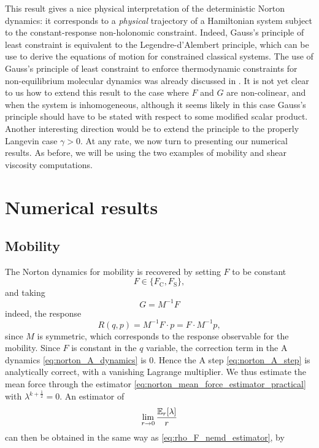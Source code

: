 This result gives a nice physical interpretation of the deterministic Norton dynamics: it corresponds to a \textit{physical} trajectory of a Hamiltonian system subject to the constant-response non-holonomic constraint.
Indeed, Gauss's principle of least constraint \cite{G29} is equivalent to the Legendre-d'Alembert principle, which can be use to derive the equations of motion for constrained classical systems.
The use of Gauss's principle of least constraint to enforce thermodynamic constraints for non-equilibrium molecular dynamics was already discussed in \cite{EHFML83}.
It is not yet clear to us how to extend this result to the case where $F$ and $G$ are non-colinear, and when the system is inhomogeneous, although it seems likely in this case Gauss's principle should have to be stated with respect to some modified scalar product.
Another interesting direction would be to extend the principle to the properly Langevin case $\gamma>0$. At any rate, we now turn to presenting our numerical results.
As before, we will be using the two examples of mobility and shear viscosity computations.

\section{Numerical results}

\subsection{Mobility}
The Norton dynamics for mobility is recovered by setting $F$ to be constant
\[F \in \{F_{\mathrm{C}},F_{\mathrm{S}}\},\]
and taking 
\[G =M^{-1}F\]
indeed, the response
\[R(q,p) = M^{-1}F\cdot p = F\cdot M^{-1}p,\]
since $M$ is symmetric, which corresponds to the response observable for the mobility. Since $F$ is constant in the $q$ variable, the correction term in the A dynamics \eqref{eq:norton_A_dynamics} is $0$.
Hence the A step \eqref{eq:norton_A_step} is analytically correct, with a vanishing Lagrange multiplier.
 We thus estimate the mean force through the estimator \eqref{eq:norton_mean_force_estimator_practical} with $\lambda^{k+\frac12}=0$.
An estimator of \[\underset{r\to 0}{\lim}\,\frac{\mathbb{E}_r[\lambda]}{r}\] 
can then be obtained in the same way as \eqref{eq:rho_F_nemd_estimator}, by 

